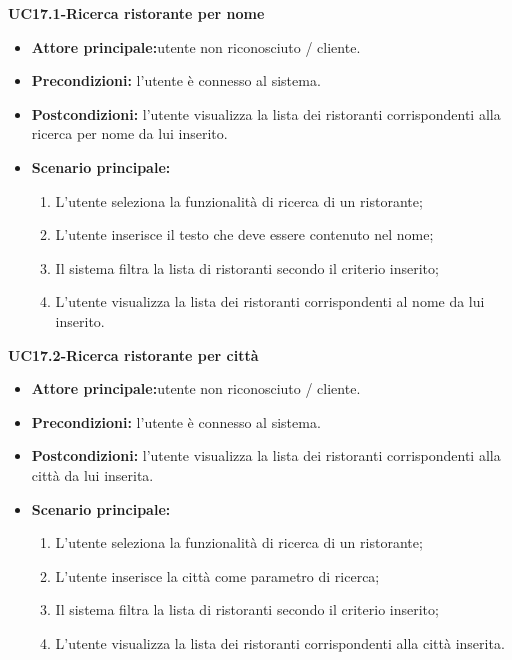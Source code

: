 \textbf{UC17.1-Ricerca ristorante per nome}
\begin{itemize}
\item \textbf{Attore principale:}utente non riconosciuto / cliente.
\item \textbf{Precondizioni:} l'utente è connesso al sistema.
\item \textbf{Postcondizioni:} l'utente visualizza la lista dei ristoranti corrispondenti 
alla ricerca per nome da lui inserito.
\item \textbf{Scenario principale:}
\begin{enumerate}
    \item L'utente seleziona la funzionalità di ricerca di un ristorante;
    \item L'utente inserisce il testo che deve essere contenuto nel nome; 
    \item  Il sistema filtra la lista di ristoranti secondo il criterio inserito;
    \item L'utente visualizza la lista dei ristoranti corrispondenti al nome da lui inserito.
\end{enumerate}
\end{itemize}

\textbf{UC17.2-Ricerca ristorante per città}
\begin{itemize}
\item \textbf{Attore principale:}utente non riconosciuto / cliente.
\item \textbf{Precondizioni:} l'utente è connesso al sistema.
\item \textbf{Postcondizioni:} l'utente visualizza la lista dei ristoranti corrispondenti alla città da lui inserita.
\item \textbf{Scenario principale:}
\begin{enumerate}
    \item L'utente seleziona la funzionalità di ricerca di un ristorante;
    \item L'utente inserisce la città come parametro di ricerca;
    \item Il sistema filtra la lista di ristoranti secondo il criterio inserito;
    \item L'utente visualizza la lista dei ristoranti corrispondenti alla città inserita.
\end{enumerate}
\end{itemize}

